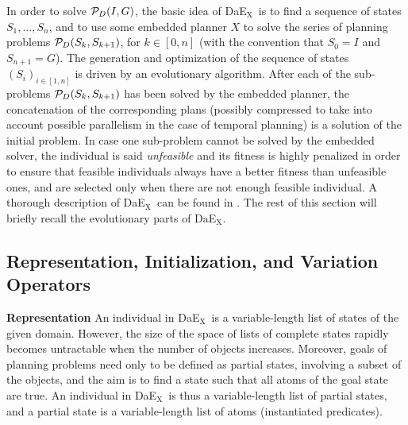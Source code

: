 \documentclass{llncs}
\def\DAEX{{\sc DaE$_{\text{X}}$}}
\renewcommand{\paragraph}[1]{{\bf #1}}
\begin{document}
In order to solve  ${\cal P}_D(I,G)$, the basic idea of \DAEX\ is to find a sequence of states $S_1, \ldots, S_n$, and to use some embedded planner $X$ to solve the series of planning problems ${\cal P}_D(S_{k},S_{k+1})$, for $k \in [0,n]$ (with the convention that $S_0 = I$ and $S_{n+1} = G$).
The generation and optimization of the sequence of states $(S_i)_{i \in [1,n]}$  is driven by an evolutionary algorithm. After each of the sub-problems ${\cal P}_D(S_{k},S_{k+1})$ has been solved by the embedded planner, the concatenation of the corresponding plans (possibly compressed to take into account possible parallelism in the case of temporal planning) is a solution of the initial problem. In case one sub-problem cannot be solved by the embedded solver, the individual is said {\em unfeasible} and its fitness is highly penalized in order to ensure that feasible individuals always have a better fitness than unfeasible ones, and are selected only when there are not enough feasible individual. A thorough description of \DAEX\ can be found in \cite{Bibai2010}. The rest of this section will briefly recall the evolutionary parts of \DAEX.

\subsection{Representation, Initialization, and Variation Operators}
\paragraph{Representation}
An individual in \DAEX\ is a  variable-length list of states of the given domain.
However, the size of the space of lists of complete states rapidly becomes untractable when the number of objects increases. Moreover, goals of planning problems need only to be defined as partial states, involving a subset of the objects, and the aim is to find a state such that all atoms of the goal state are true. An individual in \DAEX\ is thus a variable-length list of partial states, and a partial state is a variable-length list of atoms (instantiated predicates).
\end{document}
